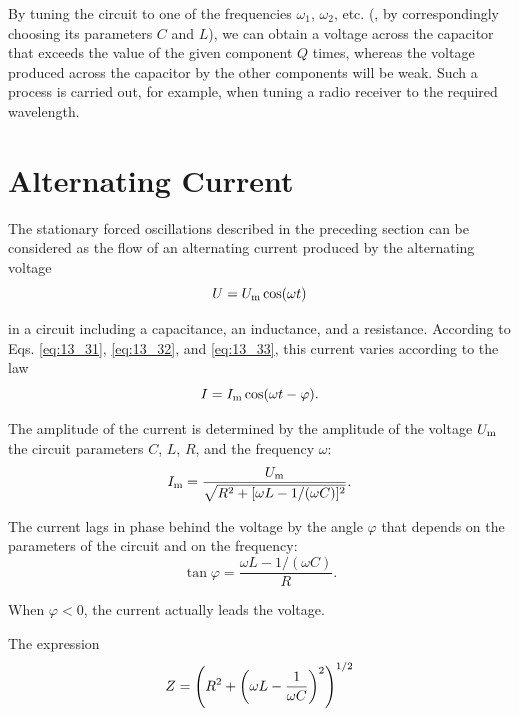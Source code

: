 \noindent
By tuning the circuit to one of the frequencies $\omega_1$, $\omega_2$, etc. (\ie, by correspondingly choosing its parameters $C$ and $L$), we can obtain a voltage across the capacitor that exceeds the value of the given component $Q$ times, whereas the voltage produced across the capacitor by the other components will be weak.
Such a process is carried out, for example, when tuning a radio receiver to the required wavelength.

\section{Alternating Current}\label{sec:13_5}

The stationary forced oscillations described in the preceding section can be considered as the flow of an alternating current produced by the alternating voltage
\vspace{-12pt}
\begin{equation}\label{eq:13_45}
    U = U_{\text{m}} \cos(\omega t)
\end{equation}

\noindent
in a circuit including a capacitance, an inductance, and a resistance.
According to Eqs. \eqref{eq:13_31}, \eqref{eq:13_32}, and \eqref{eq:13_33}, this current varies according to the law
\begin{equation}\label{eq:13_46}
    I = I_{\text{m}} \cos(\omega t - \varphi).
\end{equation}

\noindent
The amplitude of the current is determined by the amplitude of the voltage $U_{\text{m}}$ the circuit parameters $C$, $L$, $R$, and the frequency $\omega$:
\begin{equation}\label{eq:13_47}
    I_{\text{m}} = \frac{U_{\text{m}}}{\sqrt{R^2+[\omega L - 1/(\omega C)]^2}}.
\end{equation}

\noindent
The current lags in phase behind the voltage by the angle $\varphi$ that depends on the parameters of the circuit and on the frequency:
\begin{equation}\label{eq:13_48}
    \tan\varphi = \frac{\omega L - 1/(\omega C)}{R}.
\end{equation}

\noindent
When $\varphi<0$, the current actually leads the voltage.

The expression
\begin{equation}\label{eq:13_49}
    Z = \left(R^2 + \left(\omega L - \frac{1}{\omega C}\right)^2\right)^{1/2}
\end{equation}

